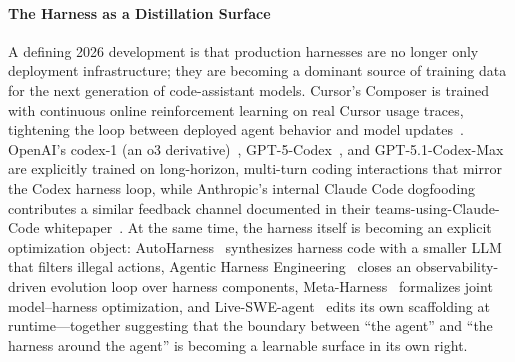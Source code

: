 \documentclass{llmxive}
\begin{document}
\paragraph{The Harness as a Distillation Surface}
A defining 2026 development is that production harnesses are no longer only deployment infrastructure; they are becoming a dominant source of training data for the next generation of code-assistant models.
Cursor's Composer is trained with continuous online reinforcement learning on real Cursor usage traces, tightening the loop between deployed agent behavior and model updates~\citep{cursor2025composer,cursor2025rtrl}.
OpenAI's codex-1 (an o3 derivative)~\citep{codex2025}, GPT-5-Codex~\citep{openai2025gpt5codexcard}, and GPT-5.1-Codex-Max~\citep{openai2026codexmax} are explicitly trained on long-horizon, multi-turn coding interactions that mirror the Codex harness loop, while Anthropic's internal Claude Code dogfooding contributes a similar feedback channel documented in their teams-using-Claude-Code whitepaper~\citep{anthropic2025teams}.
At the same time, the harness itself is becoming an explicit optimization object: AutoHarness~\citep{lou2026autoharness} synthesizes harness code with a smaller LLM that filters illegal actions, Agentic Harness Engineering~\citep{lin2026agentic} closes an observability-driven evolution loop over harness components, Meta-Harness~\citep{lee2026metaharness} formalizes joint model--harness optimization, and Live-SWE-agent~\citep{xia2025live} edits its own scaffolding at runtime---together suggesting that the boundary between ``the agent'' and ``the harness around the agent'' is becoming a learnable surface in its own right.
\end{document}
